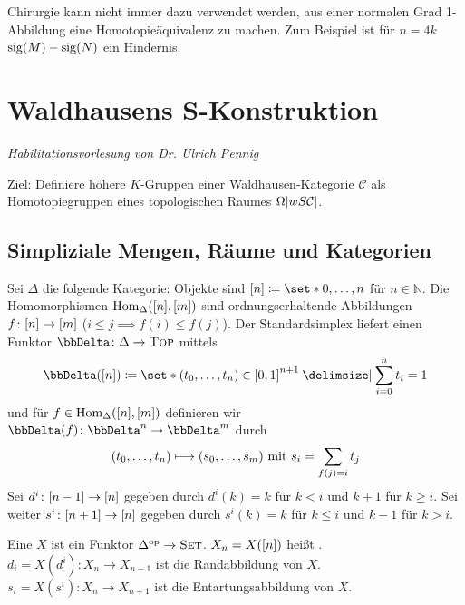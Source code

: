 \begin{bemerkung}
	Chirurgie kann nicht immer dazu verwendet werden, aus einer normalen Grad 1-Abbildung eine Homotopieäquivalenz zu machen.
	Zum Beispiel ist für $n=4k$ $\sig(M) - \sig(N)$ ein Hindernis.
\end{bemerkung}
\newpage

\section{Waldhausens S-Konstruktion} %
\label{sec:waldhausens}
\emph{Habilitationsvorlesung von Dr. Ulrich Pennig}

Ziel: Definiere höhere $K$-Gruppen einer Waldhausen-Kategorie $\mathcal{C}$ als Homotopiegruppen eines topologischen Raumes $\Omega \abs*{w S \mathcal{C}}$.

\subsection{Simpliziale Mengen, Räume und Kategorien} %
\label{sub:1}
Sei $\Delta$ die folgende Kategorie: Objekte sind $\benbrace*{n} \coloneqq \set*{0, \ldots ,n}$ für $n \in \mathbb{N}$.
Die Homomorphismen $\Hom_\Delta(\benbrace*{n}, \benbrace*{m})$ sind ordnungserhaltende Abbildungen $f \colon \benbrace*{n} \to \benbrace*{m}$ ($i\le j \implies f(i) \le f(j)$).
Der Standardsimplex liefert einen Funktor $\DDelta \colon \Delta \to \TOP$ mittels
\[
	\DDelta \enbrace*{\benbrace*{n}} \coloneqq \set*{\enbrace*{t_0, \ldots ,t_n} \in \benbrace*{0,1}^{n+1} \given \sum_{i=0}^n t_i = 1}
\]
und für $f \in \Hom_\Delta( \benbrace*{n}, \benbrace*{m})$ definieren wir $\DDelta(f) \colon \DDelta^n \to \DDelta^m$ durch 
\[
	\enbrace*{t_0, \ldots ,t_n} \longmapsto (s_0, \ldots ,s_m) \text{ mit } s_i = \sum_{f(j)=i} t_j 
\]
Sei $d^i \colon \benbrace*{n-1} \to \benbrace*{n}$ gegeben durch $d^i(k) = k$ für $k < i$ und $k+1$ für $k \ge i$.
Sei weiter $s^i \colon \benbrace*{n+1} \to \benbrace*{n}$ gegeben durch $s^i(k) = k$ für $k \le i$ und $k-1$ für $k > i$.

\begin{definition}
	Eine  $X$ ist ein Funktor $\Delta^\op \to \SET$.
	$X_n = X \enbrace*{[n]}$  heißt .
	$d_i = X(d^i) \colon X_n \to X_{n-1}$ ist die Randabbildung von $X$.
	$s_i = X(s^i) \colon X_n \to X_{n+1}$ ist die Entartungsabbildung von $X$.
\end{definition}

